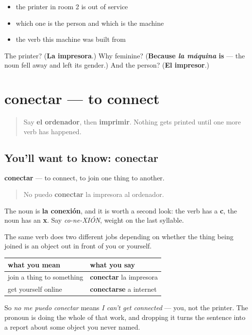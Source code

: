 \begin{itemize}
\raggedright
  \item the printer in room 2 is out of service
  \item which one is the person and which is the machine
  \item the verb this machine was built from
\end{itemize}

\begin{tcolorbox}[breakable,colback=teal!4,colframe=teal!35!black,title={Before you move on}]
The printer? (\textbf{La impresora}.) Why feminine? (\textbf{Because \emph{la máquina} is} — the noun fell away and left its gender.) And the person? (\textbf{El impresor}.)
\end{tcolorbox}
\section[conectar]{conectar — to connect}

\label{lesson:ES-C469-conectar}



\begin{quote}
Say \textbf{el ordenador}, then \textbf{imprimir}. Nothing gets printed until one more verb has happened.
\end{quote}

\subsection*{You'll want to know: conectar}
\textbf{conectar} — to connect, to join one thing to another.

\begin{quote}
No puedo \textbf{conectar} la impresora al ordenador.
\end{quote}

The noun is \textbf{la conexión}, and it is worth a second look: the verb has a \textbf{c}, the noun has an \textbf{x}. Say \emph{co-ne-XIÓN}, weight on the last syllable.

\begin{grammarlens}[title={Grammar Lens: conectar and conectarse}]
The same verb does two different jobs depending on whether the thing being joined is an object out in front of you or yourself.

\noindent
\begin{tabularx}{\linewidth}{@{}>{\raggedright\arraybackslash}X>{\raggedright\arraybackslash}X@{}}
\toprule
\textbf{what you mean} & \textbf{what you say} \\
\midrule
join a thing to something & \textbf{conectar} la impresora \\
get yourself online & \textbf{conectarse} a internet \\
\bottomrule
\end{tabularx}

So \emph{no me puedo conectar} means \emph{I can't get connected} — you, not the printer. The pronoun is doing the whole of that work, and dropping it turns the sentence into a report about some object you never named.
\end{grammarlens}

